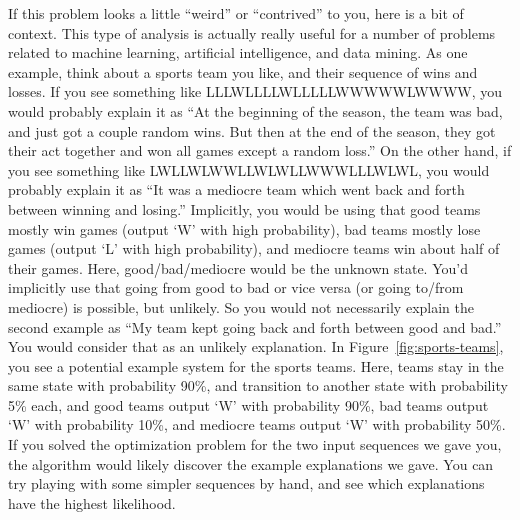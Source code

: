 \documentclass[10pt]{article}
\begin{document}
  If this problem looks a little ``weird'' or ``contrived'' to you, here is a bit of context. This type of analysis is actually really useful for a number of problems related to machine learning, artificial intelligence, and data mining. As one example, think about a sports team you like, and their sequence of wins and losses. If you see something like LLLWLLLLWLLLLLWWWWWLWWWW, you would probably explain it as ``At the beginning of the season, the team was bad, and just got a couple random wins. But then at the end of the season, they got their act together and won all games except a random loss.'' On the other hand, if you see something like LWLLWLWWLLWLWLLWWWLLLWLWL, you would probably explain it as ``It was a mediocre team which went back and forth between winning and losing.''
  Implicitly, you would be using that good teams mostly win games (output `W' with high probability), bad teams mostly lose games (output `L' with high probability), and mediocre teams win about half of their games. Here, good/bad/mediocre would be the unknown state. You'd implicitly use that going from good to bad or vice versa (or going to/from mediocre) is possible, but unlikely. So you would not necessarily explain the second example as ``My team kept going back and forth between good and bad.'' You would consider that as an unlikely explanation.
In Figure~\ref{fig:sports-teams}, you see a potential example system for the sports teams. Here, teams stay in the same state with probability 90\%, and transition to another state with probability 5\% each, and good teams output `W' with probability 90\%, bad teams output `W' with probability 10\%, and mediocre teams output `W' with probability 50\%. If you solved the optimization problem for the two input sequences we gave you, the algorithm would likely discover the example explanations we gave. You can try playing with some simpler sequences by hand, and see which explanations have the highest likelihood.


\end{document}
